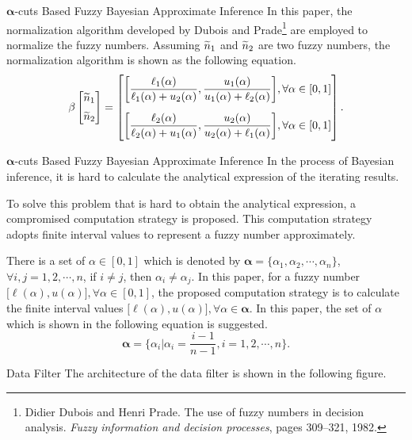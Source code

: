 \begin{frame}{$\bm{\alpha}$-cuts Based Fuzzy Bayesian Approximate Inference}
    In this paper, the normalization algorithm developed by Dubois and Prade\footnote{ Didier Dubois and Henri Prade. The use of fuzzy numbers in decision analysis. \emph{Fuzzy information and decision processes}, pages 309–321, 1982.} are employed to normalize the fuzzy numbers. Assuming $\widetilde{n}{}_1$ and $\widetilde{n}{}_2$ are two fuzzy numbers, the normalization algorithm is shown as the following equation.
    \[
    \beta
    \begin{bmatrix}
      \widetilde{n}{}_1 \\[5pt]
      \widetilde{n}{}_2
    \end{bmatrix} =
    \begin{bmatrix}
    \bigg[\dfrac{\ell_1(\alpha)}{\ell_1(\alpha) + u_2(\alpha)}, \dfrac{u_1(\alpha)}{u_1(\alpha) + \ell_2(\alpha)}\bigg], \forall \alpha \in [0, 1]\\[15pt]
    \bigg[\dfrac{\ell_2(\alpha)}{\ell_2(\alpha) + u_1(\alpha)}, \dfrac{u_2(\alpha)}{u_2(\alpha) + \ell_1(\alpha)}\bigg], \forall \alpha \in [0, 1]
    \end{bmatrix}\text{.}
    \]
\end{frame}

\begin{frame}{$\bm{\alpha}$-cuts Based Fuzzy Bayesian Approximate Inference}
In the process of Bayesian inference, it is hard to calculate the analytical expression of the iterating results.\pause

To solve this problem that is hard to obtain the analytical expression, a compromised computation strategy is proposed. This computation strategy adopts finite interval values to represent a fuzzy number approximately.\pause

There is a set of $\alpha \in [0, 1]$ which is denoted by $\bm{\alpha} = \{\alpha_1, \alpha_2, \cdots, \alpha_n\}$, $\forall i, j = 1, 2, \cdots, n$, if $i \neq j$, then $\alpha_i \neq \alpha_j$. \pause In this paper, for a fuzzy number $\big[\ell(\alpha), u(\alpha)\big], \forall \alpha \in [0, 1]$, the proposed computation strategy is to calculate the finite interval values $\big[\ell(\alpha), u(\alpha)\big], \forall \alpha \in \bm{\alpha}$. \pause In this paper, the set of $\alpha$ which is shown in the following equation is suggested.
\[
  \bm{\alpha} = \bigg\{\alpha_i\Big| \alpha_i = \frac{i-1}{n-1}, i = 1, 2, \cdots, n\bigg\}\text{.}
\]
\end{frame}

\begin{frame}{Data Filter}
    The architecture of the data filter is shown in the following figure.

    \resizebox{\textwidth}{!}{}
\end{frame}

